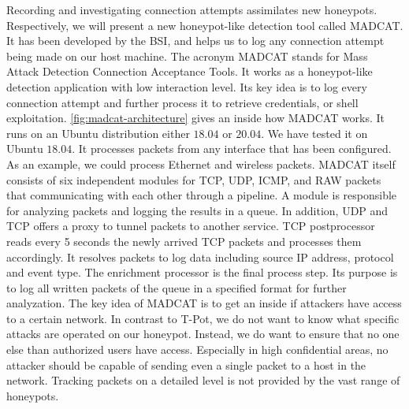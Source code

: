 Recording and investigating connection attempts assimilates new honeypots.
Respectively, we will present a new honeypot-like detection tool called MADCAT.
It has been developed by the BSI, and helps us to log any connection attempt being made on our host machine.
The acronym MADCAT stands for Mass Attack Detection Connection Acceptance Tools.
It works as a honeypot-like detection application with low interaction level.
Its key idea is to log every connection attempt and further process it to retrieve credentials, or shell exploitation.
\autoref{fig:madcat-architecture} gives an inside how MADCAT works.
It runs on an Ubuntu distribution either $18.04$ or $20.04$.
We have tested it on Ubuntu $18.04$.
It processes packets from any interface that has been configured.
As an example, we could process Ethernet and wireless packets.
MADCAT itself consists of six independent modules for TCP, UDP, ICMP, and RAW packets that communicating with each other through a pipeline.
A module is responsible for analyzing packets and logging the results in a queue.
In addition, UDP and TCP offers a proxy to tunnel packets to another service.
TCP postprocessor reads every 5 seconds the newly arrived TCP packets and processes them accordingly.
It resolves packets to log data including source IP address, protocol and event type.
The enrichment processor is the final process step.
Its purpose is to log all written packets of the queue in a specified format for further analyzation.
The key idea of MADCAT is to get an inside if attackers have access to a certain network.
In contrast to T-Pot, we do not want to know what specific attacks are operated on our honeypot.
Instead, we do want to ensure that no one else than authorized users have access.
Especially in high confidential areas, no attacker should be capable of sending even a single packet to a host in the network.
Tracking packets on a detailed level is not provided by the vast range of honeypots.

